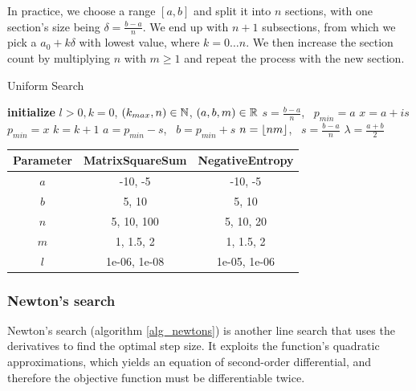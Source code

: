 \documentclass[english, 12pt, a4paper, sci, utf8, a-1b, online, table]{aaltothesis}
\newcommand{\floor}[1]{\ensuremath\lfloor#1\rfloor}
\newcommand{\R}{\ensuremath\mathbb{R}}
\newcommand{\N}{\ensuremath\mathbb{N}}
\begin{document}
In practice, we choose a range $[a, b]$ and split it into $n$ sections, with one section's size being $\delta = \frac{b - a}{n}$. We end up with $n + 1$ subsections, from which we pick a $a_0 + k \delta$ with lowest value, where $k = 0 \dots n$. We then increase the section count by multiplying $n$ with $m \geq 1$ and repeat the process with the new section.

\begin{algorithm}[H]
\caption{Uniform Search}
\label{alg_uniform}
\begin{algorithmic}[1]
\STATE \textbf{initialize} $l > 0, k = 0$, $(k_{max}, n) \in \N$, $(a, b, m) \in \R$
\STATE $s = \frac{b - a}{n}$, \ $p_{min} = a$
        \STATE $x = a + i s$
            \STATE $p_{min} = x$
        \ENDIF
        \STATE $k = k + 1$
    \ENDFOR
    \STATE $a = p_{min} - s$, \ $b = p_{min} + s$
    \STATE $n = \floor{n m}$, \ $s = \frac{b - a}{n}$
\ENDWHILE
\RETURN $\lambda = \frac{a + b}{2}$
\end{algorithmic}
\end{algorithm}

\begin{table}[H]
\label{tab:params_UniformSearch}
\centering
{}
\begin{tabular}{|c|c|c|}
\hline
\rowcolor{gray!25}
Parameter & MatrixSquareSum & NegativeEntropy \\
\hline
$a$ & -10, -5 & -10, -5 \\
$b$ & 5, 10 & 5, 10 \\
$n$ & 5, 10, 100 & 5, 10, 20 \\
$m$ & 1, 1.5, 2 & 1, 1.5, 2 \\
$l$ & 1e-06, 1e-08 & 1e-05, 1e-06 \\
\hline
\end{tabular}
\end{table}


\subsubsection{Newton's search}
\label{sect:newtonssearch}


Newton's search (algorithm \ref{alg_newtons}) is another line search that uses the derivatives to find the optimal step size. It exploits the function's quadratic approximations, which yields an equation of second-order differential, and therefore the objective function must be differentiable twice. \cite{book:nonlinear_programming}
\end{document}
